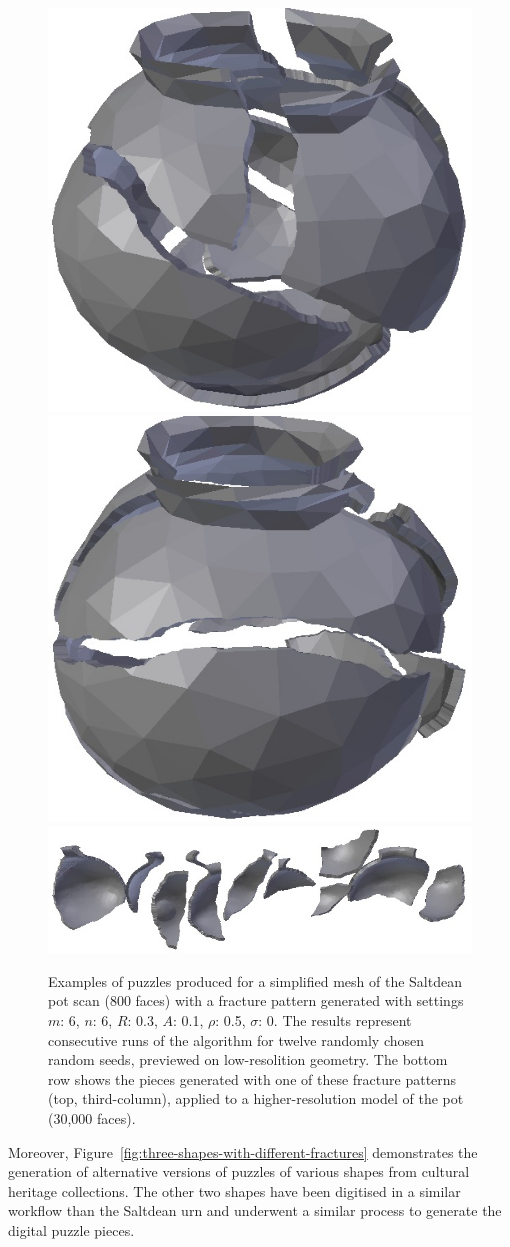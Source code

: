 \documentclass[acmlarge,screen,dvipsnames]{acmart}
\begin{document}
\begin{figure}[p!]
  \includegraphics[width=0.22\linewidth]{images/pot17.jpg}
  \includegraphics[width=0.22\linewidth]{images/pot18.jpg}
  \includegraphics[width=0.88\linewidth]{images/allselected.jpg}\\[-1.0\baselineskip]
  \caption{\label{manyexamples}%
    Examples of puzzles produced for a simplified mesh of the 
    Saltdean pot scan (800 faces)
    with a fracture pattern generated with settings $m$: 6, $n$: 6,
    $R$: 0.3, $A$: 0.1, $\rho$: 0.5, $\sigma$: 0. The
      results represent consecutive runs of the algorithm
      for twelve randomly chosen random seeds, previewed
      on low-resolition geometry. The bottom row
      shows the pieces generated with one of these fracture
      patterns (top, third-column), applied to a higher-resolution
      model of the pot (30,000 faces).}
\end{figure}

Moreover, Figure~\ref{fig:three-shapes-with-different-fractures}
demonstrates the generation of alternative versions of puzzles of
various shapes from cultural heritage collections. The other two
shapes have been digitised in a similar workflow than the Saltdean urn
and underwent a similar process to generate the digital puzzle pieces.

\end{document}

